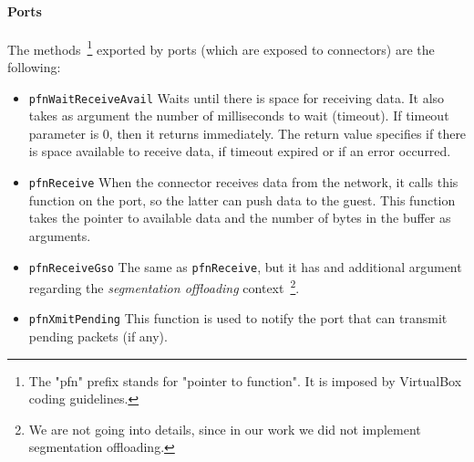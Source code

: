 \documentclass[a4paper, 12pt, titlepage]{report}
\begin{document}
\paragraph{Ports}
The methods~\footnote{The "pfn" prefix stands for "pointer to function". It is imposed by VirtualBox coding guidelines.} exported by ports (which are exposed to connectors) are the following:
\begin{itemize}
\item \texttt{pfnWaitReceiveAvail} Waits until there is space for receiving data. It also takes as argument the number of milliseconds to wait (timeout). If timeout parameter is 0, then it returns immediately. The return value specifies if there is space available to receive data, if timeout expired or if an error occurred.
\item \texttt{pfnReceive} When the connector receives data from the network, it calls this function on the port, so the latter can push data to the guest. This function takes the pointer to available data and the number of bytes in the buffer as arguments.
\item \texttt{pfnReceiveGso} The same as \texttt{pfnReceive}, but it has and additional argument regarding the \textit{segmentation offloading} context~\footnote{We are not going into details, since in our work we did not implement segmentation offloading.}.
\item \texttt{pfnXmitPending} This function is used to notify the port that can transmit pending packets (if any).
\end{itemize}
\end{document}
